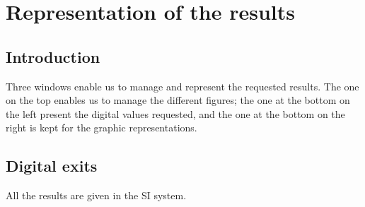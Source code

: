 \chapter{Representation of the results}\label{chap6}

\minitoc

\section{Introduction}

Three windows enable us to manage and represent the requested results.
The one on the top enables us to manage the different figures; the one
at the bottom on the left present the digital values requested, and
the one at the bottom on the right is kept for the graphic
representations.

\section{Digital exits}

All the results are given in the SI system.


